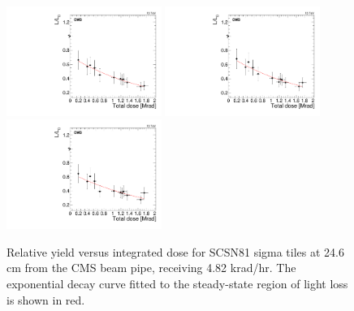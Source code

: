 \begin{figure}[tbp!]
\centering
\includegraphics[width=0.45\textwidth]{figures/SCSN81-S-24p6cm-f3ch2-dose.pdf}
\includegraphics[width=0.45\textwidth]{figures/SCSN81-S-24p6cm-f14ch4-dose.pdf}
\includegraphics[width=0.45\textwidth]{figures/SCSN81-S-24p6cm-f15ch4-dose.pdf}
\caption{Relative yield versus integrated dose for SCSN81 sigma tiles at 24.6 cm from the CMS beam pipe, receiving 4.82 krad/hr. The exponential decay curve fitted to the steady-state region of light loss is shown in red.}
\label{fig:SCSN81-S-24p6cm-dose}
\end{figure} 

